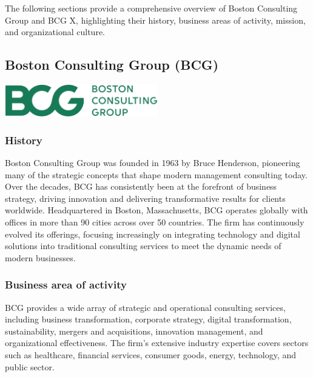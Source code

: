 The following sections provide a comprehensive overview of Boston Consulting Group and BCG X, highlighting their history, business areas of activity, mission, and organizational culture.

\subsection{Boston Consulting Group (BCG)}

\vspace{0.2cm}
\begin{center}
    \centering
    \includegraphics[width=0.5\textwidth]{Images/Boston-Consulting-Group-Logo.jpg}
     \cite{bcg_logo}
    \label{fig:bcg_logo}
\end{center}

\subsubsection{History}
Boston Consulting Group was founded in 1963 by Bruce Henderson, pioneering many of the strategic concepts that shape modern management consulting today. Over the decades, BCG has consistently been at the forefront of business strategy, driving innovation and delivering transformative results for clients worldwide. Headquartered in Boston, Massachusetts, BCG operates globally with offices in more than 90 cities across over 50 countries. The firm has continuously evolved its offerings, focusing increasingly on integrating technology and digital solutions into traditional consulting services to meet the dynamic needs of modern businesses.

\subsubsection{Business area of activity}
BCG provides a wide array of strategic and operational consulting services, including business transformation, corporate strategy, digital transformation, sustainability, mergers and acquisitions, innovation management, and organizational effectiveness. The firm's extensive industry expertise covers sectors such as healthcare, financial services, consumer goods, energy, technology, and public sector.\mynewline

